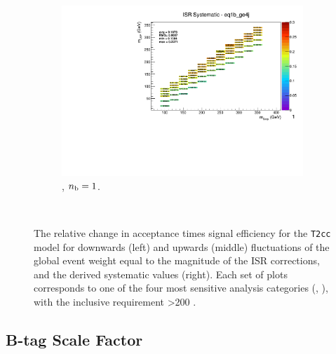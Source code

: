 \begin{figure}[ht!]
\begin{subfigure}[b]{0.32\textwidth}
    \includegraphics[width=\textwidth, page=1]{Figs/sms/t2cc/v37_2/systs/T2cc_ISR_eq1b_ge4j.pdf}
    \caption{\njhigh, $n_{\text{b}} = 1$.}
  \end{subfigure}\\
  \caption{The relative change in acceptance times signal efficiency for the
  \texttt{T2cc} model for downwards (left) and upwards (middle) fluctuations
  of the global event weight equal to the magnitude of the ISR corrections,
  and the derived systematic values (right). Each set of plots corresponds
  to one of the four most sensitive analysis categories (\nb, \nj), with the
  inclusive requirement \HT>200 \gev.}
  \label{fig:sms-isr-t2cc}
\end{figure}


\newpage
\subsection*{B-tag Scale Factor}
\label{sec:t2cc_btag_plots}

